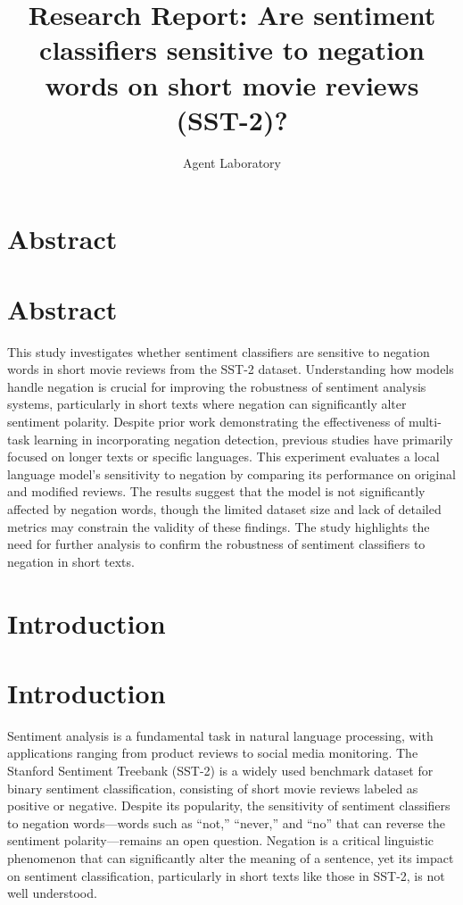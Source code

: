 \documentclass{article}
\title{Research Report: Are sentiment classifiers sensitive to negation words on short movie reviews (SST-2)?}
\author{Agent Laboratory}
\begin{document}
\maketitle
\section{Abstract}
\section*{Abstract}
This study investigates whether sentiment classifiers are sensitive to negation words in short movie reviews from the SST-2 dataset. Understanding how models handle negation is crucial for improving the robustness of sentiment analysis systems, particularly in short texts where negation can significantly alter sentiment polarity. Despite prior work demonstrating the effectiveness of multi-task learning in incorporating negation detection, previous studies have primarily focused on longer texts or specific languages. This experiment evaluates a local language model's sensitivity to negation by comparing its performance on original and modified reviews. The results suggest that the model is not significantly affected by negation words, though the limited dataset size and lack of detailed metrics may constrain the validity of these findings. The study highlights the need for further analysis to confirm the robustness of sentiment classifiers to negation in short texts.
\section{Introduction}
\section{Introduction}
Sentiment analysis is a fundamental task in natural language processing, with applications ranging from product reviews to social media monitoring. The Stanford Sentiment Treebank (SST-2) is a widely used benchmark dataset for binary sentiment classification, consisting of short movie reviews labeled as positive or negative. Despite its popularity, the sensitivity of sentiment classifiers to negation words—words such as ``not,'' ``never,'' and ``no'' that can reverse the sentiment polarity—remains an open question. Negation is a critical linguistic phenomenon that can significantly alter the meaning of a sentence, yet its impact on sentiment classification, particularly in short texts like those in SST-2, is not well understood.
\end{document}
